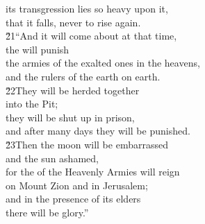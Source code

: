 \begin{poetry}
\poeml its transgression lies so heavy upon it, \\
\poemll    that it falls, never to rise again. \\
\poeml \v{21}``And it will come about at that time, \\
\poemll    the  will punish \\
\poeml the armies of the exalted ones in the heavens, \\
\poemll    and the rulers of the earth on earth. \\
\poeml \v{22}They will be herded together \\
\poemll    into the Pit; \\
\poeml they will be shut up in prison, \\
\poemll    and after many days they will be punished. \\
\poeml \v{23}Then the moon will be embarrassed \\
\poemll    and the sun ashamed, \\
\poeml for the  of the Heavenly Armies will reign \\
\poemll    on Mount Zion and in Jerusalem; \\
\poeml and in the presence of its elders \\
\poemll    there will be glory.''
\end{poetry}

